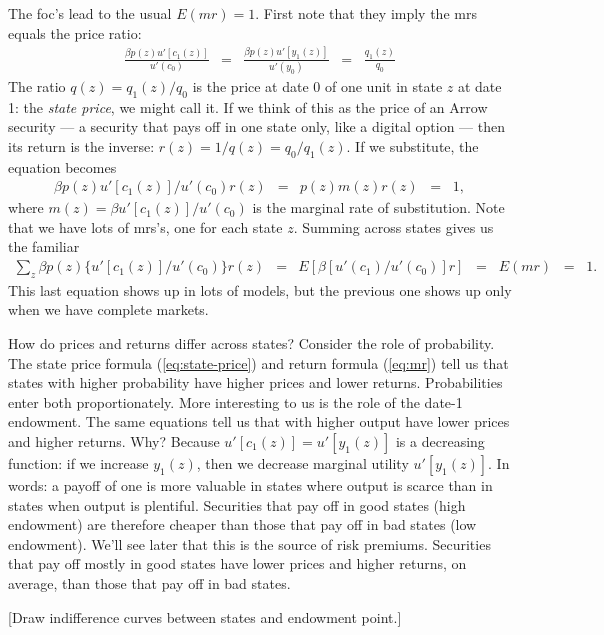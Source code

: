 \documentclass[11pt]{article}
\begin{document}
The foc's lead to the usual $E(mr) = 1$.
First note that they imply the mrs equals the price ratio:
\begin{eqnarray}
    \frac{\beta p(z) u'[c_1(z)]}{u'(c_0)} &=&
    \frac{\beta p(z) u'[y_1(z)]}{u'(y_0)}
    \;\;=\;\; \frac{q_1(z)}{q_0}
    \label{eq:state-price}
\end{eqnarray}
The ratio $q(z) = q_1(z)/q_0$ is the price at date 0 of one unit in state $z$ at date 1:
the {\it state price\/}, we might call it.
If we think of this as the price of an Arrow security ---
a security that pays off in one state only, like a digital option ---
then its return is the inverse:  $r(z) = 1/q(z) = q_0/q_1(z)$.
If we substitute, the equation becomes
\begin{eqnarray}
    \beta p(z) u'[c_1(z)]/u'(c_0) r(z) &=& p(z) m(z) r(z) \;\;=\;\;  1 ,
    \label{eq:mr}
\end{eqnarray}
where $m(z) = \beta u'[c_1(z)]/u'(c_0)$ is the marginal rate of substitution.
Note that we have lots of mrs's, one for each state $z$.
Summing across states gives us the familiar
\begin{eqnarray*}
    \sum_z \beta p(z) \{ u'[c_1(z)]/u'(c_0)\} r(z) &=&
    E \left[ \beta  [u'(c_1)/u'(c_0)] r \right]
    \;\;=\;\; E(mr)
    \;\;=\;\; 1 .
\end{eqnarray*}
This last equation shows up in lots of models,
but the previous one shows up only when we have complete markets.

How do prices and returns differ across states?
Consider the role of probability.
The state price formula (\ref{eq:state-price})
and return formula (\ref{eq:mr})
tell us that states with higher probability
have higher prices and lower returns.
Probabilities enter both proportionately.
More interesting to us is the role of the date-1 endowment.
The same equations tell us that with higher output have lower prices
and higher returns.
Why?  Because $u'[c_1(z)] = u'[y_1(z)]$ is a decreasing function:
if we increase $y_1(z)$, then we decrease marginal utility $u'[y_1(z)]$.
In words: a payoff of one is more valuable in states where output is scarce
than in states when output is plentiful.
Securities that pay off in good states (high endowment) are therefore
cheaper than those that pay off in bad states (low endowment).
We'll see later that this is the source of risk premiums.
Securities that pay off mostly in good states have lower prices
and higher returns, on average, than those that pay off in bad states.

[Draw indifference curves between states and endowment point.]
\end{document}

